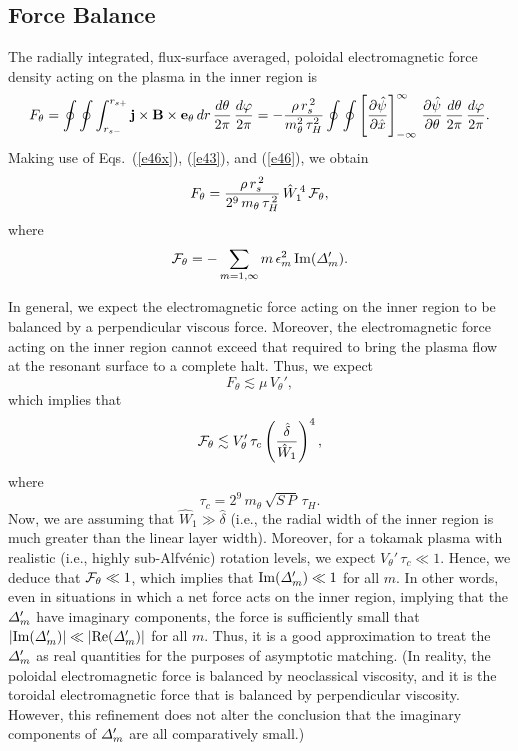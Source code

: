 \documentclass[12pt,prb,aps]{revtex4-1}
\begin{document}
\subsection{Force Balance}
The radially integrated, flux-surface averaged, poloidal electromagnetic force density acting on the
plasma in the inner region is
\begin{equation}
F_\theta = \oint\oint\int_{r_{s-}}^{r_{s+}}{\bf j}\times {\bf B}\times {\bf e}_\theta\,dr\,\frac{d\theta}{2\pi}\,\frac{d\varphi}{2\pi} =-\frac{\rho\,r_s^{\,2}}{m_\theta^2\,\tau_H^2}\oint\oint\left[\frac{\partial\hat{\psi}}{\partial\hat{x}}\right]_{-\infty}^\infty\,\frac{\partial\hat{\psi}}{\partial \theta}\,\frac{d\theta}{2\pi}\,\frac{d\varphi}{2\pi}.
\end{equation}
Making use of Eqs.~(\ref{e46x}), (\ref{e43}), and (\ref{e46}), we obtain
\begin{equation}
F_\theta = \frac{\rho\,r_s^{\,2}}{2^9\,m_\theta\,\tau_H^{\,2}}\,\hat{W}_1^{\,4}\,{\cal F}_\theta,
\end{equation}
where
\begin{equation}
{\cal F}_\theta =-\sum_{m=1,\infty}m\,\epsilon_m^2\,{\rm Im}({\mit\Delta}_m').
\end{equation}

In general, we expect the electromagnetic force acting on the inner region to be balanced by a perpendicular viscous force.\cite{rf0} Moreover, the electromagnetic force acting on the inner region cannot exceed that required to bring the plasma flow at the resonant surface to a complete halt.\cite{rf0} Thus, we expect
\begin{equation}
F_\theta \lesssim \mu\,V_\theta',
\end{equation}
which implies that
\begin{equation}
{\cal F}_\theta \lesssim V_\theta'\,\tau_c\left(\frac{\hat{\delta}}{\hat{W}_1}\right)^4,
\end{equation}
where
\begin{equation}
\tau_c = 2^9\,m_\theta\,\sqrt{S\,P}\,\tau_H.
\end{equation}
Now, we are assuming that $\hat{W}_1\gg \hat{\delta}$ (i.e., the radial width of the inner region is much greater than the linear layer width). Moreover, for a tokamak plasma with realistic (i.e., highly sub-Alfv\'{e}nic) rotation levels, we expect $V_\theta'\,\tau_c\ll 1$. Hence, we deduce that ${\cal F}_\theta\ll 1$, which
implies that ${\rm Im}({\mit\Delta}_m')\ll 1$ for all $m$. In other words, even in situations in which a net force acts on the
inner region, implying that the ${\mit\Delta}_m'$ have imaginary components, the force is sufficiently small that  $|{\rm Im}({\mit\Delta}_m')|\ll |{\rm Re}({\mit\Delta}_m')|$ for all $m$. 
Thus, it is a good approximation to treat the ${\mit\Delta}_m'$ as real quantities for the purposes of asymptotic matching. 
(In reality, the poloidal electromagnetic force is balanced by neoclassical viscosity, and it is the toroidal electromagnetic force that is balanced by perpendicular viscosity. However, this
refinement does not alter the conclusion that the imaginary components of ${\mit\Delta}_m'$ are all comparatively small.)
\end{document}
